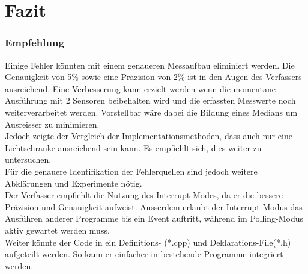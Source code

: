 \part{Fazit}
\section{Empfehlung}
Einige Fehler könnten mit einem genaueren Messaufbau eliminiert werden.
Die Genauigkeit von 5\% sowie eine Präzision von 2\% ist in den Augen des Verfassers ausreichend. Eine Verbesserung kann erzielt werden wenn die momentane Ausführung mit 2 Sensoren beibehalten wird und die erfassten Messwerte noch weiterverarbeitet werden. Vorstellbar wäre dabei die Bildung eines Medians um Ausreisser zu minimieren.\\

Jedoch zeigte der Vergleich der Implementationsmethoden, dass auch nur eine Lichtschranke ausreichend sein kann. Es empfiehlt sich, dies weiter zu untersuchen.\\

Für die genauere Identifikation der Fehlerquellen sind jedoch weitere Abklärungen und Experimente nötig.\\

Der Verfasser empfiehlt die Nutzung des Interrupt-Modes, da er die bessere Präzision und Genauigkeit aufweist. Ausserdem erlaubt der Interrupt-Modus das Ausführen anderer Programme bis ein Event auftritt, während im Polling-Modus aktiv gewartet werden muss.\\

Weiter könnte der Code in ein Definitions- (*.cpp) und Deklarations-File(*.h) aufgeteilt werden. So kann er einfacher in bestehende Programme integriert werden.